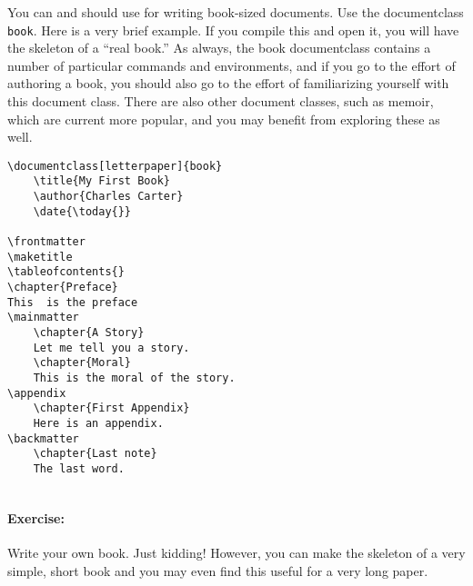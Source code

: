         You can and should use \Lx{} for writing book-sized documents. Use the documentclass \texttt{book}. Here is a very brief example. If you compile this and open it, you will have the skeleton of a ``real book.'' As always, the book documentclass contains a number of particular commands and environments, and if you go to the effort of authoring a book, you should also go to the effort of familiarizing yourself with this document class. There are also other document classes, such as memoir, which are current more popular, and you may benefit from exploring these as well.

        \begin{verbatim}
\documentclass[letterpaper]{book}
	\title{My First Book}
	\author{Charles Carter}
	\date{\today{}}

\frontmatter
\maketitle
\tableofcontents{}
\chapter{Preface}
This  is the preface
\mainmatter
    \chapter{A Story}
    Let me tell you a story.
    \chapter{Moral}
    This is the moral of the story. 
\appendix
    \chapter{First Appendix}
    Here is an appendix.
\backmatter
    \chapter{Last note}
    The last word.
    
        \end{verbatim}

        \paragraph{Exercise:} Write your own book. Just kidding! However, you can make the skeleton of a very simple, short book and you may even find this useful for a very long paper.

